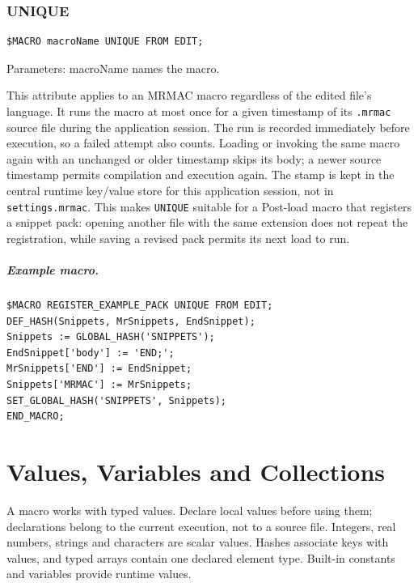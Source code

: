 \documentclass[a4paper,10pt,twoside,openany]{book}
\newenvironment{mrmacextension}{\begin{changebar}}{\end{changebar}}
\begin{document}
\begin{mrmacextension}
\label{prim:keyword-unique}
\subsection*{UNIQUE}
\begin{verbatim}
$MACRO macroName UNIQUE FROM EDIT;
\end{verbatim}
Parameters: macroName names the macro.

This attribute applies to an MRMAC macro regardless of the edited file's
language. It runs the macro at most once for a given timestamp of its
\texttt{.mrmac} source file during the application session. The run is
recorded immediately before execution, so a
failed attempt also counts. Loading or invoking the same macro again with an
unchanged or older timestamp skips its body; a newer source timestamp permits
compilation and execution again. The stamp is kept in the central runtime
key/value store for this application session, not in \texttt{settings.mrmac}.
This makes \texttt{UNIQUE} suitable for a Post-load macro that registers a
snippet pack: opening another file with the same extension does not repeat
the registration, while saving a revised pack permits its next load to run.

\paragraph{Example macro.}
\begin{verbatim}
$MACRO REGISTER_EXAMPLE_PACK UNIQUE FROM EDIT;
DEF_HASH(Snippets, MrSnippets, EndSnippet);
Snippets := GLOBAL_HASH('SNIPPETS');
EndSnippet['body'] := 'END;';
MrSnippets['END'] := EndSnippet;
Snippets['MRMAC'] := MrSnippets;
SET_GLOBAL_HASH('SNIPPETS', Snippets);
END_MACRO;
\end{verbatim}
\end{mrmacextension}

\chapter{Values, Variables and Collections}

A macro works with typed values. Declare local values before using them; declarations belong to the current execution, not to a source file. Integers, real numbers, strings and characters are scalar values. Hashes associate keys with values, and typed arrays contain one declared element type. Built-in constants and variables provide runtime values.
\end{document}
